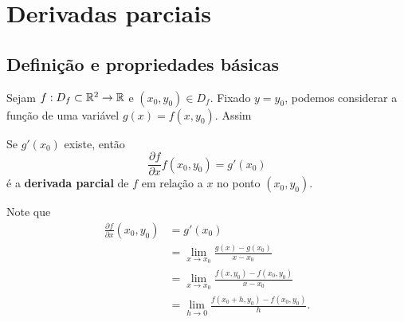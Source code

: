 \chapter{Derivadas parciais}

\section{Definição e propriedades básicas}

Sejam \(f:D_f\subset\mathbb{R}^2 \to \mathbb{R}\) e \((x_0,y_0)\in D_f\). Fixado \(y=y_0\), podemos considerar a função de uma variável \(g(x) = f(x,y_0)\). Assim
\begin{definition}
    Se \(g'(x_0)\) existe, então \[\frac{\partial f}{\partial x} f(x_0,y_0) = g'(x_0)\] é a \textbf{derivada parcial} de \(f\) em relação a \(x\) no ponto \((x_0,y_0)\). 
\end{definition}

Note que
    \begin{align*}
        \frac{\partial f}{\partial x} (x_0,y_0) 
            & = g'(x_0)\\
            & = \lim_{x\to x_0} \frac{g(x) - g(x_0)}{x-x_0} \\
            & = \lim_{x\to x_0} \frac{f(x,y_0) - f(x_0,y_0)}{x-x_0} \\
            & = \lim_{h\to 0} \frac{f(x_0 + h,y_0) - f(x_0,y_0)}{h}.
    \end{align*}

